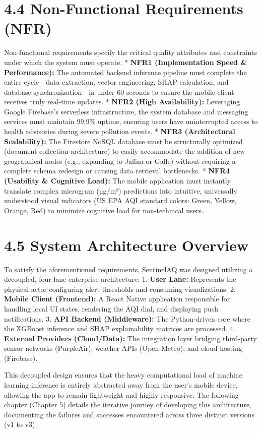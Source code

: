 \section{4.4 Non-Functional Requirements
(NFR)}\label{non-functional-requirements-nfr}

Non-functional requirements specify the critical quality attributes and
constraints under which the system must operate. * \textbf{NFR1
(Implementation Speed \& Performance):} The automated backend inference
pipeline must complete the entire cycle---data extraction, vector
engineering, SHAP calculation, and database synchronization---in under
60 seconds to ensure the mobile client receives truly real-time updates.
* \textbf{NFR2 (High Availability):} Leveraging Google Firebase's
serverless infrastructure, the system database and messaging services
must maintain 99.9\% uptime, ensuring users have uninterrupted access to
health advisories during severe pollution events. * \textbf{NFR3
(Architectural Scalability):} The Firestore NoSQL database must be
structurally optimized (document-collection architecture) to easily
accommodate the addition of new geographical nodes (e.g., expanding to
Jaffna or Galle) without requiring a complete schema redesign or causing
data retrieval bottlenecks. * \textbf{NFR4 (Usability \& Cognitive
Load):} The mobile application must instantly translate complex
microgram (µg/m³) predictions into intuitive, universally understood
visual indicators (US EPA AQI standard colors: Green, Yellow, Orange,
Red) to minimize cognitive load for non-technical users.

\section{4.5 System Architecture
Overview}\label{system-architecture-overview}

To satisfy the aforementioned requirements, SentinelAQ was designed
utilizing a decoupled, four-lane enterprise architecture: 1.
\textbf{User Lane:} Represents the physical actor configuring alert
thresholds and consuming visualizations. 2. \textbf{Mobile Client
(Frontend):} A React Native application responsible for handling local
UI states, rendering the AQI dial, and displaying push notifications. 3.
\textbf{API Backend (Middleware):} The Python-driven core where the
XGBoost inference and SHAP explainability matrices are processed. 4.
\textbf{External Providers (Cloud/Data):} The integration layer bridging
third-party sensor networks (PurpleAir), weather APIs (Open-Meteo), and
cloud hosting (Firebase).

This decoupled design ensures that the heavy computational load of
machine learning inference is entirely abstracted away from the user's
mobile device, allowing the app to remain lightweight and highly
responsive. The following chapter (Chapter 5) details the iterative
journey of developing this architecture, documenting the failures and
successes encountered across three distinct versions (v1 to v3).
